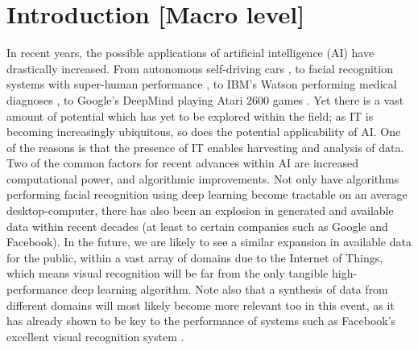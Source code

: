 
\chapter{Introduction [Macro level]}\label{chpt:intro}


In recent years, the possible applications of artificial intelligence (AI) have drastically increased. From autonomous self-driving cars \citep{Urmson2009}, to facial recognition systems with super-human performance \citep{Sun2014}, to IBM's Watson performing medical diagnoses \citep{Wagle2013}, to Google's DeepMind playing Atari 2600 games \citep{Mnih2015}. Yet there is a vast amount of potential which has yet to be explored within the field; as IT is becoming increasingly ubiquitous, so does the potential applicability of AI. One of the reasons is that the presence of IT enables harvesting and analysis of data. Two of the common factors for recent advances within AI are increased computational power, and algorithmic improvements. Not only have algorithms performing facial recognition using deep learning become tractable on an average desktop-computer, there has also been an explosion in generated and available data within recent decades (at least to certain companies such as Google and Facebook). In the future, we are likely to see a similar expansion in available data for the public, within a vast array of domains due to the Internet of Things, which means visual recognition will be far from the only tangible high-performance deep learning algorithm. Note also that a synthesis of data from different domains will most likely become more relevant too in this event, as it has already shown to be key to the performance of systems such as Facebook's excellent visual recognition system \citep{}.
\\

